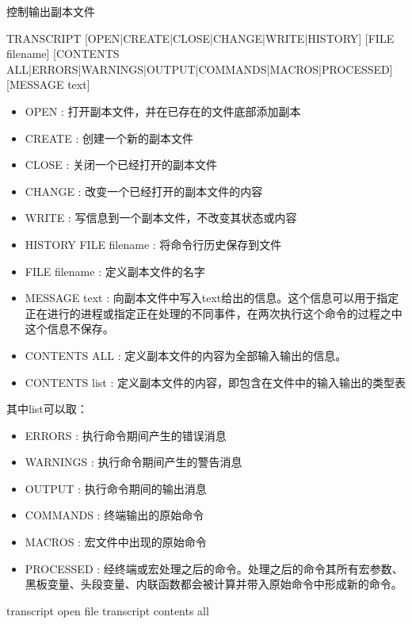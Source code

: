 \label{cmd:transcript}

控制输出副本文件

\begin{SACSTX}
TRANSCRIPT [OPEN|CREATE|CLOSE|CHANGE|WRITE|HISTORY] [FILE filename]  
    [CONTENTS ALL|ERRORS|WARNINGS|OUTPUT|COMMANDS|MACROS|PROCESSED] 
    [MESSAGE text]
\end{SACSTX}

\begin{itemize}
\item OPEN : 打开副本文件，并在已存在的文件底部添加副本 
\item CREATE : 创建一个新的副本文件 
\item CLOSE : 关闭一个已经打开的副本文件 
\item CHANGE : 改变一个已经打开的副本文件的内容 
\item WRITE : 写信息到一个副本文件，不改变其状态或内容 
\item HISTORY FILE filename : 将命令行历史保存到文件 
\item FILE filename : 定义副本文件的名字 
\item MESSAGE text : 向副本文件中写入text给出的信息。这个信息可以用于指定正在进行的进程或指定正在处理的不同事件，在两次执行这个命令的过程之中这个信息不保存。 
\item CONTENTS ALL : 定义副本文件的内容为全部输入输出的信息。 
\item CONTENTS list : 定义副本文件的内容，即包含在文件中的输入输出的类型表
\end{itemize}
其中list可以取：
\begin{itemize}
\item ERRORS : 执行命令期间产生的错误消息
\item WARNINGS : 执行命令期间产生的警告消息
\item OUTPUT : 执行命令期间的输出消息 
\item COMMANDS : 终端输出的原始命令 
\item MACROS : 宏文件中出现的原始命令 
\item PROCESSED : 经终端或宏处理之后的命令。处理之后的命令其所有宏参数、黑板变量、头段变量、内联函数都会被计算并带入原始命令中形成新的命令。
\end{itemize}

\begin{SACDFT}
transcript open file transcript contents all
\end{SACDFT}

